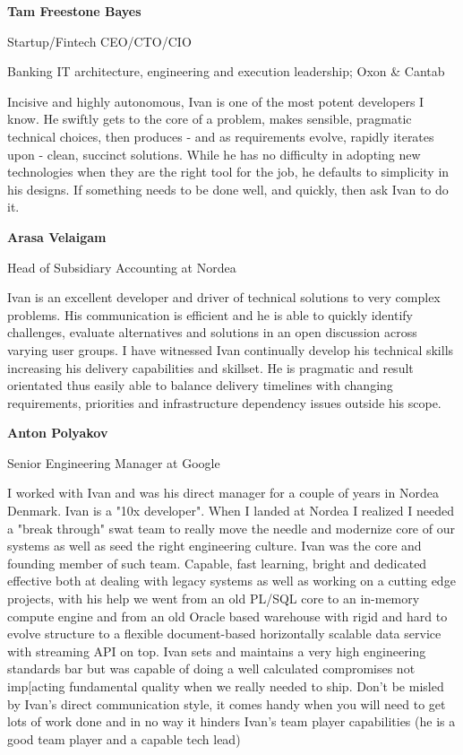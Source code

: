 \documentclass[letterpaper,11pt]{article}
\begin{document}
\renewcommand{\mkbegdispquote}[2]{\itshape}

\textbf{Tam Freestone Bayes}

Startup/Fintech CEO/CTO/CIO

Banking IT architecture, engineering and execution leadership; Oxon & Cantab

\begin{displayquote}
Incisive and highly autonomous, Ivan is one of the most potent developers I know.
He swiftly gets to the core of a problem, makes sensible, pragmatic technical choices, then produces - and as requirements evolve, rapidly iterates upon - clean, succinct solutions. While he has no difficulty in adopting new technologies when they are the right tool for the job, he defaults to simplicity in his designs. If something needs to be done well, and quickly, then ask Ivan to do it.
\end{displayquote}

\textbf{Arasa Velaigam}

Head of Subsidiary Accounting at Nordea
\begin{displayquote}
Ivan is an excellent developer and driver of technical solutions to very complex problems. His communication is efficient and he is able to quickly identify challenges, evaluate alternatives and solutions in an open discussion across varying user groups.
I have witnessed Ivan continually develop his technical skills increasing his delivery capabilities and skillset.
He is pragmatic and result orientated thus easily able to balance delivery timelines with changing requirements, priorities and infrastructure dependency issues outside his scope.
\end{displayquote}

\textbf{Anton Polyakov}

Senior Engineering Manager at Google

\begin{displayquote}
I worked with Ivan and was his direct manager for a couple of years in Nordea Denmark. Ivan is a "10x developer". When I landed at Nordea I realized I needed a "break through" swat team to really move the needle and modernize core of our systems as well as seed the right engineering culture. Ivan was the core and founding member of such team. Capable, fast learning, bright and dedicated effective both at dealing with legacy systems as well as working on a cutting edge projects, with his help we went from an old PL/SQL core to an in-memory compute engine and from an old Oracle based warehouse with rigid and hard to evolve structure to a flexible document-based horizontally scalable data service with streaming API on top. Ivan sets and maintains a very high engineering standards bar but was capable of doing a well calculated compromises not imp[acting fundamental quality when we really needed to ship.
Don't be misled by Ivan's direct communication style, it comes handy when you will need to get lots of work done and in no way it hinders Ivan's team player capabilities (he is a good team player and a capable tech lead)
\end{displayquote}
\end{document}
